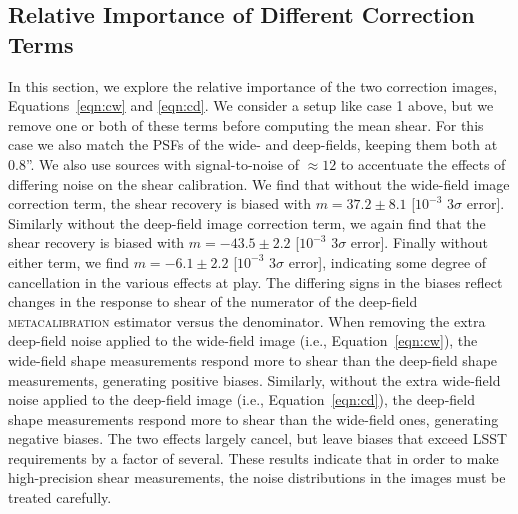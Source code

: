 \documentclass[twocolumn]{openjournal}
\makeatletter
\newcommand{\mcal}{\textsc{metacalibration}\@\xspace}
\makeatother
\begin{document}
\subsection{Relative Importance of Different Correction Terms}\label{sec:terms}

In this section, we explore the relative importance of the two correction images,
Equations~\ref{eqn:cw} and \ref{eqn:cd}. We consider a setup like case 1 above, but we
remove one or both of these terms before computing the mean shear. For this case we also
match the PSFs of the wide- and deep-fields, keeping them both at 0.8''. We also use
sources with signal-to-noise of $\approx12$ to accentuate the effects of differing noise
on the shear calibration. We find that without the wide-field image correction term, the
shear recovery is biased with $m=37.2\pm8.1$ [$10^{-3}$ $3\sigma$ error]. Similarly
without the deep-field image correction term, we again find that the shear recovery is biased
with $m=-43.5\pm2.2$ [$10^{-3}$ $3\sigma$ error]. Finally without either term, we find
$m=-6.1\pm2.2$ [$10^{-3}$ $3\sigma$ error], indicating some degree of cancellation in
the various effects at play. The differing signs in the biases reflect changes in the
response to shear of the numerator of the deep-field \mcal estimator versus the
denominator. When removing the extra deep-field noise applied to the wide-field image
(i.e., Equation~\ref{eqn:cw}), the wide-field shape measurements respond more to shear
than the deep-field shape measurements, generating positive biases. Similarly, without
the extra wide-field noise applied to the deep-field image (i.e.,
Equation~\ref{eqn:cd}), the deep-field shape measurements respond more to shear than the
wide-field ones, generating negative biases. The two effects largely cancel, but leave
biases that exceed LSST requirements by a factor of several. These results indicate that
in order to make high-precision shear measurements, the noise distributions in the
images must be treated carefully.
\end{document}
